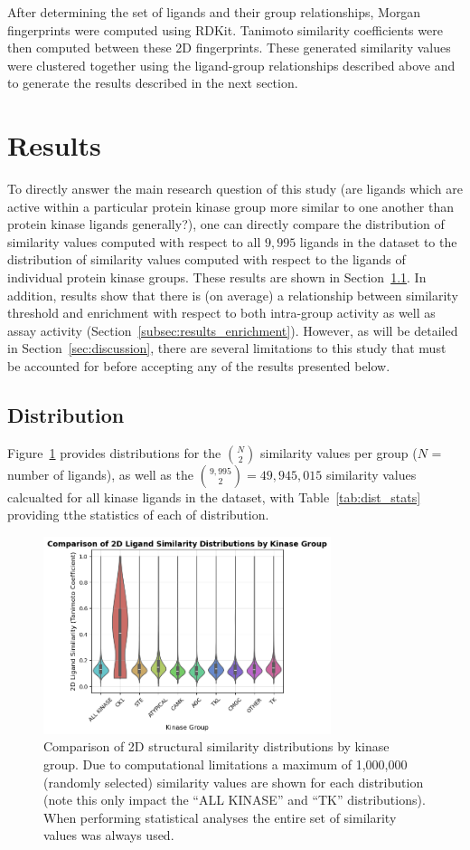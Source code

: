 \documentclass[11pt]{article}
\begin{document}
After determining the set of ligands and their group relationships, Morgan fingerprints were computed using RDKit. 
Tanimoto similarity coefficients were then computed between these 2D fingerprints. 
These generated similarity values were clustered together using the ligand-group relationships described above and to generate the results described in the next section.
\section{Results}
To directly answer the main research question of this study (are ligands which are active within a particular protein kinase group more similar to one another than protein kinase ligands generally?), one can directly compare the distribution of similarity values computed with respect to all $9,995$ ligands in the dataset to the distribution of similarity values computed with respect to the ligands of individual protein kinase groups. 
These results are shown in Section~\ref{subsec:dist_results}. 
In addition, results show that there is (on average) a relationship between similarity threshold and enrichment with respect to both intra-group activity as well as assay activity (Section~\ref{subsec:results_enrichment}). 
However, as will be detailed in Section~\ref{sec:discussion}, there are several limitations to this study that must be accounted for before accepting any of the results presented below.
 
\subsection{Distribution}\label{subsec:dist_results}
Figure~\ref{fig:violin_plot} provides distributions for the ${N\choose 2}$ similarity values per group ($N$ = number of ligands), as well as the ${9,995 \choose 2} = 49,945,015$ similarity values calcualted for all kinase ligands in the dataset, with Table~\ref{tab:dist_stats} providing tthe statistics of each of distribution. 
\begin{figure}[H]
    \centering
    \includegraphics[width=0.75\textwidth]{../figures/violin_plot.png}
    \caption{Comparison of 2D structural similarity distributions by kinase group. Due to computational limitations a maximum of 1,000,000 (randomly selected) similarity values are shown for each distribution (note this only impact the ``ALL KINASE'' and ``TK'' distributions). When performing statistical analyses the entire set of similarity values was always used.}
    \label{fig:violin_plot}
\end{figure}
\end{document}
